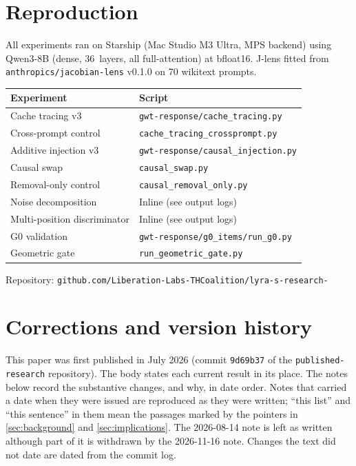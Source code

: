\documentclass[11pt,a4paper]{article}
\begin{document}
\section{Reproduction}
\label{app:reproduction}

All experiments ran on Starship (Mac Studio M3 Ultra, MPS backend) using
Qwen3-8B (dense, 36~layers, all full-attention) at bfloat16. J-lens
fitted from \texttt{anthropics/jacobian-lens} v0.1.0 on 70 wikitext
prompts.

\begin{table}[ht]
\centering
\small
\begin{tabular}{ll}
\toprule
\textbf{Experiment} & \textbf{Script} \\
\midrule
Cache tracing v3 & \texttt{gwt-response/cache\_tracing.py} \\
Cross-prompt control & \texttt{cache\_tracing\_crossprompt.py} \\
Additive injection v3 & \texttt{gwt-response/causal\_injection.py} \\
Causal swap & \texttt{causal\_swap.py} \\
Removal-only control & \texttt{causal\_removal\_only.py} \\
Noise decomposition & Inline (see output logs) \\
Multi-position discriminator & Inline (see output logs) \\
G0 validation & \texttt{gwt-response/g0\_items/run\_g0.py} \\
Geometric gate & \texttt{run\_geometric\_gate.py} \\
\bottomrule
\end{tabular}
\end{table}

\noindent Repository:
\texttt{github.com/Liberation-Labs-THCoalition/lyra-s-research-}

\section{Corrections and version history}
\label{sec:corrections}

This paper was first published in July 2026 (commit \texttt{9d69b37}
of the \texttt{published-research} repository). The body states each current result in
its place. The notes below record the substantive changes, and why, in
date order. Notes that carried a date when they were issued are
reproduced as they were written; ``this list'' and ``this sentence'' in
them mean the passages marked by the pointers in \cref{sec:background}
and \cref{sec:implications}. The 2026-08-14 note is left as written
although part of it is withdrawn by the 2026-11-16 note. Changes the
text did not date are dated from the commit log.
\end{document}
